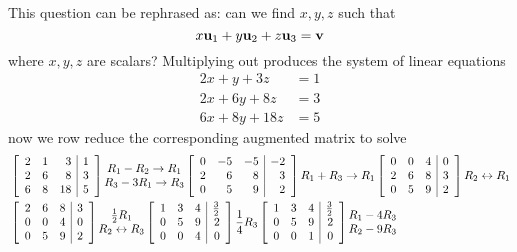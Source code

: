\begin{solution}
This question can be rephrased as: can we find $x,y,z$ such that
$$x{\bf u}_1+y{\bf u}_2+z{\bf u}_3={\bf v}$$
where $x,y,z$ are scalars? Multiplying out produces the system of linear equations
\begin{align*}
2x+y+3z&=1\\
2x+6y+8z&=3\\
6x+8y+18z&=5
\end{align*}
now we row reduce the corresponding augmented matrix to solve
\begin{align*}
&\leftB \begin{array}{rrr|r} 2 & 1 & 3 & 1 \\ 2 & 6 & 8 & 3\\ 6 & 8 & 18 & 5 \end{array}\rightB \begin{matrix} R_1-R_2\to R_1\\ R_3-3R_1\to R_3 \end{matrix}
\leftB \begin{array}{rrr|r} 0 & -5 & -5 & -2 \\ 2 & 6 & 8 & 3 \\ 0 & 5 & 9 & 2 \end{array}\rightB R_1+R_3\to R_1
\leftB \begin{array}{rrr|r} 0 & 0 & 4 & 0 \\ 2 & 6 & 8 & 3 \\ 0 & 5 & 9 & 2 \end{array}\rightB R_2\leftrightarrow R_1 \\
&\leftB \begin{array}{rrr|r} 2 & 6 & 8 & 3 \\ 0 & 0 & 4 & 0 \\ 0 & 5 & 9 & 2 \end{array}\rightB \begin{matrix} \frac{1}{2}R_1 \\ R_2\leftrightarrow R_3 \end{matrix}
\leftB \begin{array}{rrr|r} 1 & 3 & 4 & \frac{3}{2} \\ 0 & 5 & 9 & 2\\  0 & 0 & 4 & 0\end{array}\rightB \frac{1}{4}R_3
\leftB \begin{array}{rrr|r} 1 & 3 & 4 & \frac{3}{2} \\ 0 & 5 & 9 & 2\\  0 & 0 & 1 & 0 \end{array}\rightB \begin{matrix} R_1-4R_3 \\ R_2-9R_3 \end{matrix} \\

\end{align*}
\end{solution}
